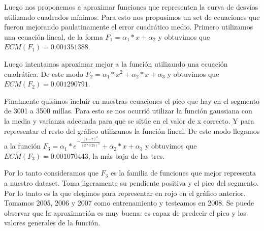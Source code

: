 Luego nos proponemos a aproximar funciones que representen la curva de desv\'ios utilizando cuadrados m\'inimos. Para esto nos propusimos un set de ecuaciones que fueron mejorando paulatinamente el error cuadr\'atico medio.
Primero utilizamos una ecuaci\'on lineal, de la forma $F_1 = \alpha_1*x + \alpha_2$ y obtuvimos que $ECM(F_1) = 0.001351388$. 

Luego intentamos aproximar mejor a la funci\'on utilizando una ecuaci\'on cuadr\'atica. De este modo $F_2 = \alpha_1*x^2 + \alpha_2 * x + \alpha_3$ y obtuvimos que $ECM(F_2) = 0.001290791$. 

Finalmente quisimos incluir en nuestras ecuaciones el pico que hay en el segmento de 3001 a 3500 millas. Para esto se nos ocurri\'o utilizar la funci\'on gaussiana con la media y varianza adecuada para que se sit\'ue en el valor de x correcto. Y para representar el resto del gr\'afico utilizamos la funci\'on lineal. De este modo llegamos a la funci\'on $F_3 = \alpha_1* e^{-\frac{(i-7)^2}{(2*0.25)^2}} + \alpha_2 * x + \alpha_3$ y obtuvimos que $ECM(F_3) = 0.001070443$, la m\'as baja de las tres. 

Por lo tanto consideramos que $F_3$ es la familia de funciones que mejor representa a nuestro dataset. Toma ligeramente su pendiente positiva y el pico del segmento. Por lo tanto es la que elegimos para representar en rojo en el gr\'afico anterior. Tomamos 2005, 2006 y 2007 como entrenamiento y testeamos en 2008. Se puede observar que la aproximaci\'on es muy buena: es capaz de predecir el pico y los valores generales de la funci\'on.	










